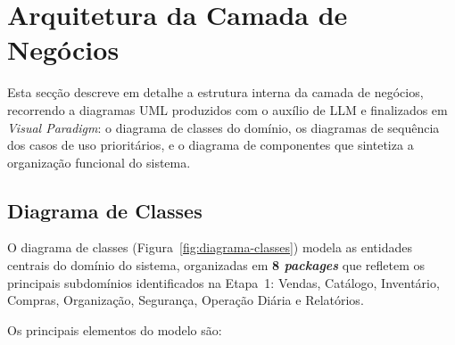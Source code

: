 \section{Arquitetura da Camada de Negócios}

    Esta secção descreve em detalhe a estrutura interna da camada de negócios, recorrendo a diagramas UML produzidos com o auxílio de LLM e finalizados em \textit{Visual Paradigm}: o diagrama de classes do domínio, os diagramas de sequência dos casos de uso prioritários, e o diagrama de componentes que sintetiza a organização funcional do sistema.

\subsection{Diagrama de Classes}
\label{subsec:classes}

    O diagrama de classes (Figura~\ref{fig:diagrama-classes}) modela as entidades centrais do domínio do sistema, organizadas em \textbf{8 \textit{packages}} que refletem os principais subdomínios identificados na Etapa~1: Vendas, Catálogo, Inventário, Compras, Organização, Segurança, Operação Diária e Relatórios.

    Os principais elementos do modelo são:

